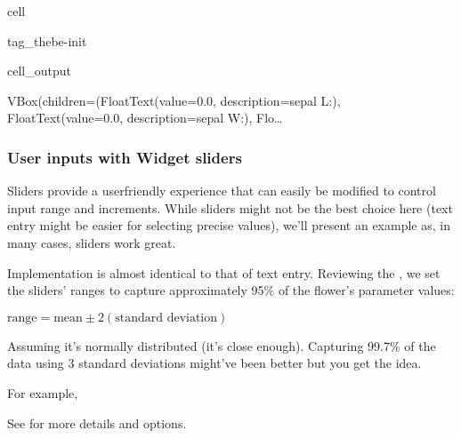 \documentclass[letterpaper,10pt,english]{jupyterBook}
\begin{document}
\begin{sphinxuseclass}{cell}
\begin{sphinxuseclass}{tag_thebe-init}
\begin{sphinxVerbatimOutput}
\begin{sphinxuseclass}{cell_output}
\begin{sphinxVerbatim}[commandchars=\\\{\}]
VBox(children=(FloatText(value=0.0, description=\PYGZsq{}sepal L:\PYGZsq{}), FloatText(value=0.0, description=\PYGZsq{}sepal W:\PYGZsq{}), Flo…
\end{sphinxVerbatim}

\end{sphinxuseclass}\end{sphinxVerbatimOutput}

\end{sphinxuseclass}
\end{sphinxuseclass}

\subsubsection{User inputs with Widget sliders}
\label{\detokenize{task2_c/example_sup_class/sup_class_ex-ui:user-inputs-with-widget-sliders}}
\sphinxAtStartPar
Sliders provide a user\sphinxhyphen{}friendly experience that can easily be modified to control input range and increments. While sliders might not be the best choice here (text entry might be easier for selecting precise values), we’ll present an example as, in many cases, sliders work great.

\sphinxAtStartPar
Implementation is almost identical to that of text entry. Reviewing the , we set the sliders’ ranges to capture approximately 95\% of the flower’s parameter values:

\sphinxAtStartPar
\(\text{range}= \text{mean}\pm 2(\text{standard deviation})\)

\sphinxAtStartPar
Assuming it’s normally distributed (it’s close enough). Capturing 99.7\% of the data using 3 standard deviations might’ve been better \sphinxhyphen{}but you get the idea.

\sphinxAtStartPar
For example,

\begin{sphinxShadowBox}
\sphinxstylesidebartitle{}

\sphinxAtStartPar
See  for more details and options.
\end{sphinxShadowBox}
\end{document}
